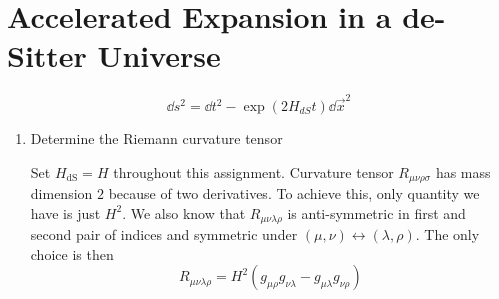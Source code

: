\section{Accelerated Expansion in a de-Sitter Universe}
\begin{equation}
   \dd{s^2} = \dd{t^2} - \exp(2 H_{dS} t) \dd{\vec{x}^2}
\end{equation}

\begin{enumerate}[label=(\alph*)]
   \item Determine the Riemann curvature tensor
   
      Set $H_\text{dS} = H$ throughout this assignment.
      Curvature tensor $R_{\mu\nu\rho\sigma}$ has mass dimension $2$ because of two derivatives. To achieve this, only quantity we have is just $H^2$. We also know that $R_{\mu\nu\lambda \rho}$ is anti-symmetric in first and second pair of indices and symmetric under $(\mu, \nu) \leftrightarrow (\lambda, \rho)$. The only choice is then
      \begin{equation}
         R_{\mu\nu\lambda \rho} = H^2 (g_{\mu\rho} g_{\nu\lambda} - g_{\mu\lambda} g_{\nu\rho})
      \end{equation}


\end{enumerate}
